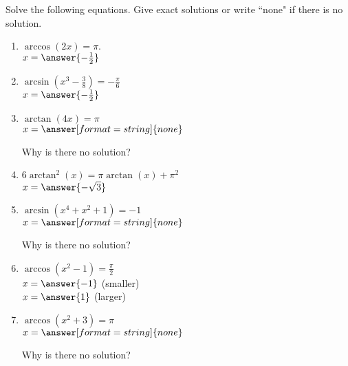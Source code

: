 \documentclass{ximera}
\author{Elizabeth Campolongo}
\begin{document}
\begin{exercise}
Solve the following equations. Give exact solutions or write ``none" if there is no solution. 
%
\begin{enumerate}

\item $\arccos(2x) = \pi.$\\
$x = \answer{-\frac{1}{2}}$

\item $\arcsin\left(x^3 - \frac{3}{8}\right) = -\frac{\pi}{6}$\\
$x = \answer{-\frac{1}{2}}$

\item $\arctan(4x) = \pi$\\
$x = \answer[format=string]{none}$
\begin{exercise}
Why is there no solution?
\begin{multipleChoice}
\end{multipleChoice}
\end{exercise}

\item $6\arctan^2(x)=\pi \arctan(x) + \pi^2$\\
$x = \answer{-\sqrt{3}}$

\item $\arcsin(x^4+x^2+1) = -1$ \\
$x = \answer[format=string]{none}$
\begin{exercise}
Why is there no solution?
\begin{multipleChoice}
\end{multipleChoice}
\end{exercise}

\item $\arccos(x^2-1) = \frac{\pi}{2}$ \\
$x = \answer{-1}$ (smaller)\\
$x = \answer{1}$ (larger)

\item $\arccos(x^2+3) = \pi$ \\
$x = \answer[format=string]{none}$
\begin{exercise}
Why is there no solution?
\begin{multipleChoice}
\end{multipleChoice}
\end{exercise}

\end{enumerate}

\end{exercise}
\end{document}
